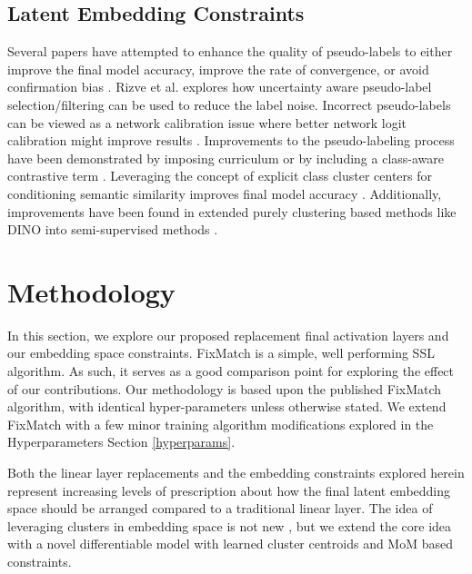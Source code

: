 \documentclass[10pt,twocolumn,letterpaper]{article}
\begin{document}
\subsection{Latent Embedding Constraints}

Several papers have attempted to enhance the quality of pseudo-labels to either improve the final model accuracy, improve the rate of convergence, or avoid confirmation bias \cite{arazo2020pseudo}.
Rizve et al. \cite{rizve2021defense} explores how uncertainty aware pseudo-label selection/filtering can be used to reduce the label noise.
Incorrect pseudo-labels can be viewed as a network calibration issue \cite{rizve2021defense} where better network logit calibration might improve results \cite{Xing2020DistanceBased}.
Improvements to the pseudo-labeling process have been demonstrated by imposing curriculum \cite{zhang2021flexmatch} or by including a class-aware contrastive term \cite{yang2022class}.
Leveraging the concept of explicit class cluster centers for conditioning semantic similarity improves final model accuracy \cite{zheng2022simmatch}.
Additionally, improvements have been found in extended purely clustering based methods like DINO \cite{caron2021emerging} into semi-supervised methods \cite{fini2023semi}.


\section{Methodology}

In this section, we explore our proposed replacement final activation layers and our embedding space constraints.
FixMatch \cite{sohn2020fixmatch} is a simple, well performing SSL algorithm.
As such, it serves as a good comparison point for exploring the effect of our contributions.
Our methodology is based upon the published FixMatch \cite{sohn2020fixmatch} algorithm, with identical hyper-parameters unless otherwise stated.
We extend FixMatch with a few minor training algorithm modifications explored in the Hyperparameters Section \ref{hyperparams}.

Both the linear layer replacements and the embedding constraints explored herein represent increasing levels of prescription about how the final latent embedding space should be arranged compared to a traditional linear layer.
The idea of leveraging clusters in embedding space is not new \cite{caron2018deep,caron2020unsupervised,enguehard2019semi}, but we extend the core idea with a novel differentiable model with learned cluster centroids and MoM based constraints.
\end{document}
